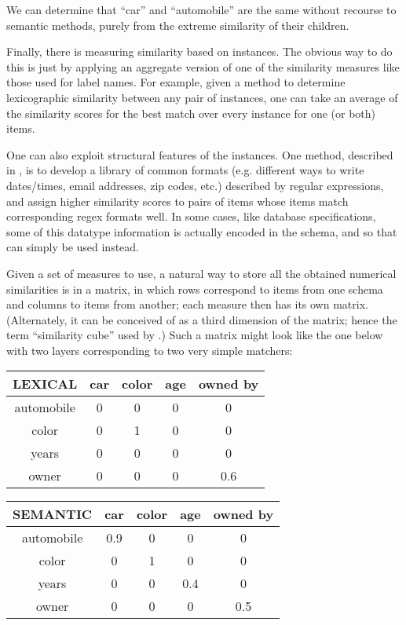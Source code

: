 \documentclass{datamade}
\theoremstyle{definition}
\theoremstyle{remark}
\begin{document}
We can determine that ``car'' and ``automobile'' are the same without recourse to semantic methods, purely from the extreme similarity of their children.

Finally, there is measuring similarity based on instances. The obvious way to do this is just by applying an aggregate version of one of the similarity measures like those used for label names. For example, given a method to determine lexicographic similarity between any pair of instances, one can take an average of the similarity scores for the best match over every instance for one (or both) items. \cite{comainstance}

One can also exploit structural features of the instances. One method, described in \cite{regex}, is to develop a library of common formats (e.g. different ways to write dates/times, email addresses, zip codes, etc.) described by regular expressions, and assign higher similarity scores to pairs of items whose items match corresponding regex formats well. In some cases, like database specifications, some of this datatype information is actually encoded in the schema, and so that can simply be used instead.

Given a set of measures to use, a natural way to store all the obtained numerical similarities is in a matrix, in which rows correspond to items from one schema and columns to items from another; each measure then has its own matrix. (Alternately, it can be conceived of as a third dimension of the matrix; hence the term ``similarity cube'' used by \cite{coma}.) Such a matrix might look like the one below with two layers corresponding to two very simple matchers:

\begin{tabular}{|c|c|c|c|c|}
	\hline
LEXICAL & car & color & age & owned by \\\hline
automobile & 0 & 0 & 0 & 0 \\\hline
color & 0 & 1 & 0 & 0 \\\hline
years & 0 & 0 & 0 & 0 \\\hline
owner & 0 & 0 & 0 & 0.6 \\\hline
\end{tabular}

\begin{tabular}{|c|c|c|c|c|}
	\hline
	SEMANTIC & car & color & age & owned by \\\hline
	automobile & 0.9 & 0 & 0 & 0 \\\hline
	color & 0 & 1 & 0 & 0 \\\hline
	years & 0 & 0 & 0.4 & 0 \\\hline
	owner & 0 & 0 & 0 & 0.5 \\\hline
\end{tabular}
\end{document}
